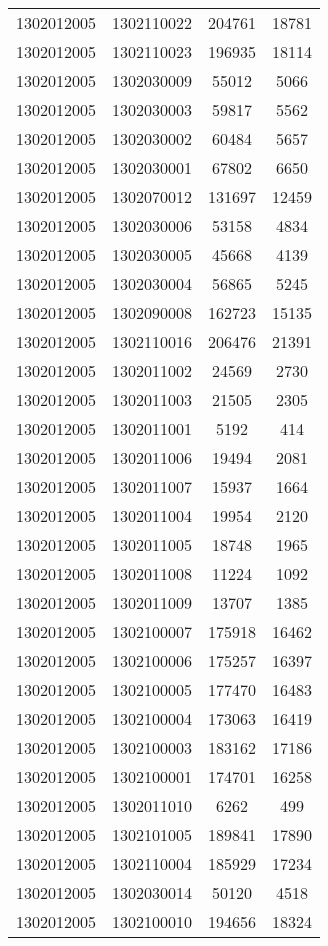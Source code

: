 \begin{longtable}[h]{llcc}
		1302012005 & 1302110022 & 204761 & 18781\\
		1302012005 & 1302110023 & 196935 & 18114\\
		1302012005 & 1302030009 & 55012 & 5066\\
		1302012005 & 1302030003 & 59817 & 5562\\
		1302012005 & 1302030002 & 60484 & 5657\\
		1302012005 & 1302030001 & 67802 & 6650\\
		1302012005 & 1302070012 & 131697 & 12459\\
		1302012005 & 1302030006 & 53158 & 4834\\
		1302012005 & 1302030005 & 45668 & 4139\\
		1302012005 & 1302030004 & 56865 & 5245\\
		1302012005 & 1302090008 & 162723 & 15135\\
		1302012005 & 1302110016 & 206476 & 21391\\
		1302012005 & 1302011002 & 24569 & 2730\\
		1302012005 & 1302011003 & 21505 & 2305\\
		1302012005 & 1302011001 & 5192 & 414\\
		1302012005 & 1302011006 & 19494 & 2081\\
		1302012005 & 1302011007 & 15937 & 1664\\
		1302012005 & 1302011004 & 19954 & 2120\\
		1302012005 & 1302011005 & 18748 & 1965\\
		1302012005 & 1302011008 & 11224 & 1092\\
		1302012005 & 1302011009 & 13707 & 1385\\
		1302012005 & 1302100007 & 175918 & 16462\\
		1302012005 & 1302100006 & 175257 & 16397\\
		1302012005 & 1302100005 & 177470 & 16483\\
		1302012005 & 1302100004 & 173063 & 16419\\
		1302012005 & 1302100003 & 183162 & 17186\\
		1302012005 & 1302100001 & 174701 & 16258\\
		1302012005 & 1302011010 & 6262 & 499\\
		1302012005 & 1302101005 & 189841 & 17890\\
		1302012005 & 1302110004 & 185929 & 17234\\
		1302012005 & 1302030014 & 50120 & 4518\\
		1302012005 & 1302100010 & 194656 & 18324\\

\end{longtable}
